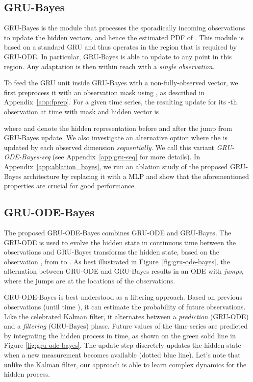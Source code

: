 \documentclass{article}
\newcommand{\method}{GRU-ODE-Bayes}
\begin{document}
\subsection{GRU-Bayes}
\label{subsec:gru_bayes}
GRU-Bayes is the module that processes the sporadically incoming observations to update the hidden vectors, and hence the estimated PDF of .
This module is based on a standard GRU and thus operates in the region  that is required by GRU-ODE. In particular, GRU-Bayes is able to update  to any point in this region. Any adaptation is then within reach with a \emph{single observation}.

To feed the GRU unit inside GRU-Bayes with a non-fully-observed vector, we first preprocess it with an observation mask using , as described in Appendix~\ref{app:fprep}. For a given time series, the resulting update for its -th observation  at time  with mask  and hidden vector  is

where  and  denote the hidden representation before and after the jump from GRU-Bayes update. We also investigate an alternative option where the  is updated by each observed dimension \emph{sequentially}. We call this variant \emph{GRU-ODE-Bayes-seq} (see Appendix~\ref{app:gru-seq} for more details). In Appendix~\ref{app:ablation_bayes}, we run an ablation study of the proposed GRU-Bayes architecture by replacing it with a MLP and show that the aforementioned properties are crucial for good performance.

\subsection{\method{}}
The proposed \method{} combines GRU-ODE and GRU-Bayes. The GRU-ODE is used to evolve the hidden state  in continuous time between the observations and GRU-Bayes transforms the hidden state, based on the observation , from  to . As best illustrated in Figure~\ref{fig:gru-ode-bayes}, the alternation between GRU-ODE and GRU-Bayes results in an ODE with \emph{jumps}, where the jumps are at the locations of the observations.

GRU-ODE-Bayes is best understood as a filtering approach. Based on previous observations (until time ), it can estimate the probability of future observations. Like the celebrated Kalman filter, it alternates between a \emph{prediction} (GRU-ODE) and a \emph{filtering} (GRU-Bayes) phase. Future values of the time series are predicted by integrating the hidden process  in time, as shown on the green solid line in Figure \ref{fig:gru-ode-bayes}. The update step discretely updates the hidden state when a new measurement becomes available (dotted blue line). Let's note that unlike the Kalman filter, our approach is able to learn complex dynamics for the hidden process.
\end{document}
